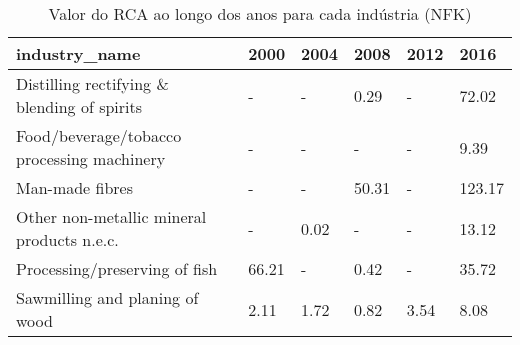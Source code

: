 \begin{table}
\centering
\caption{Valor do RCA ao longo dos anos para cada indústria (NFK)}
\begin{tabular}{p{6cm}p{1.5cm}p{1.5cm}p{1.5cm}p{1.5cm}p{1.5cm}}
\toprule
                              industry\_name &  2000 & 2004 &  2008 & 2012 &   2016 \\
\midrule
Distilling rectifying \& blending of spirits &     - &    - &  0.29 &    - &  72.02 \\
 Food/beverage/tobacco processing machinery &     - &    - &     - &    - &   9.39 \\
                            Man-made fibres &     - &    - & 50.31 &    - & 123.17 \\
 Other non-metallic mineral products n.e.c. &     - & 0.02 &     - &    - &  13.12 \\
              Processing/preserving of fish & 66.21 &    - &  0.42 &    - &  35.72 \\
             Sawmilling and planing of wood &  2.11 & 1.72 &  0.82 & 3.54 &   8.08 \\
\bottomrule
\end{tabular}
\end{table}
